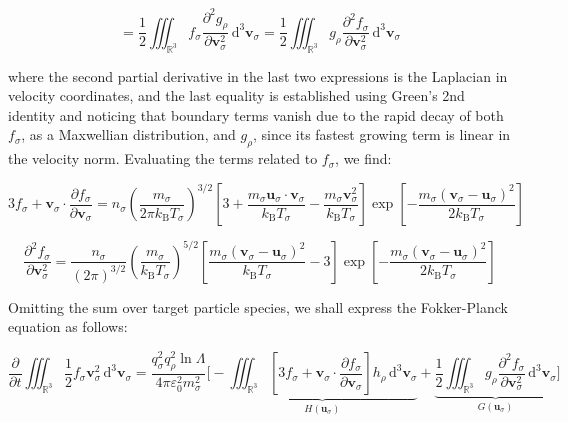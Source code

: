 \fi

\begin{equation}
    =\frac{1}{2}\iiint_{\mathbb{R}^3}f_\sigma\frac{\partial^2g_\rho}{\partial\mathbf{v}_\sigma^2}\,\mathrm{d}^3\mathbf{v}_\sigma=\frac{1}{2}\iiint_{\mathbb{R}^3}g_\rho\frac{\partial^2f_\sigma}{\partial\mathbf{v}_\sigma^2}\,\mathrm{d}^3\mathbf{v}_\sigma
\end{equation}

where the second partial derivative in the last two expressions is the Laplacian in velocity coordinates, and the last equality is established using Green's 2nd identity and noticing that boundary terms vanish due to the rapid decay of both $f_\sigma$, as a Maxwellian distribution, and $g_\rho$, since its fastest growing term is linear in the velocity norm. Evaluating the terms related to $f_\sigma$, we find:

\begin{equation}
    3f_\sigma+\mathbf{v}_\sigma\cdot\frac{\partial f_\sigma}{\partial\mathbf{v}_\sigma}=n_\sigma\left(\frac{m_\sigma}{2\pi k_\mathrm{B}T_\sigma}\right)^{3/2}\left[3+\frac{m_\sigma\mathbf{u}_\sigma\cdot\mathbf{v}_\sigma}{k_\mathrm{B}T_\sigma}-\frac{m_\sigma\mathbf{v}_\sigma^2}{k_\mathrm{B}T_\sigma}\right]\exp{\left[-\frac{m_\sigma(\mathbf{v}_\sigma-\mathbf{u}_\sigma)^2}{2k_\mathrm{B}T_\sigma}\right]}
\end{equation}

\begin{equation}
    \frac{\partial^2f_\sigma}{\partial\mathbf{v}_\sigma^2}=\frac{n_\sigma}{(2\pi)^{3/2}}\left(\frac{m_\sigma}{k_\mathrm{B}T_\sigma}\right)^{5/2}\left[\frac{m_\sigma(\mathbf{v}_\sigma-\mathbf{u}_\sigma)^2}{k_\mathrm{B}T_\sigma}-3\right]\exp{\left[-\frac{m_\sigma(\mathbf{v}_\sigma-\mathbf{u}_\sigma)^2}{2k_\mathrm{B}T_\sigma}\right]}
\end{equation}

Omitting the sum over target particle species, we shall express the Fokker-Planck equation as follows:

\begin{equation}
    \frac{\partial}{\partial t}\iiint_{\mathbb{R}^3}\frac{1}{2}f_\sigma\mathbf{v}_\sigma^2\,\mathrm{d}^3\mathbf{v}_\sigma=\frac{q_\sigma^2q_\rho^2\ln{\Lambda}}{4\pi\varepsilon_0^2m_\sigma^2}\Bigg[-\underbrace{\iiint_{\mathbb{R}^3}\left[3f_\sigma+\mathbf{v}_\sigma\cdot\frac{\partial f_\sigma}{\partial\mathbf{v}_\sigma}\right]h_\rho\,\mathrm{d}^3\mathbf{v}_\sigma}_{H(\mathbf{u}_\sigma)}+\underbrace{\frac{1}{2}\iiint_{\mathbb{R}^3}g_\rho\frac{\partial^2f_\sigma}{\partial\mathbf{v}_\sigma^2}\,\mathrm{d}^3\mathbf{v}_\sigma}_{G(\mathbf{u}_\sigma)}\Bigg]
\end{equation}

